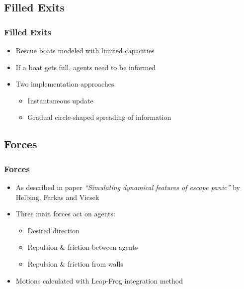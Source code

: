 \documentclass{beamer}
\begin{document}
\subsection{Filled Exits}
\begin{frame}
	\frametitle{Filled Exits}
	\begin{itemize}
		\item Rescue boats modeled with limited capacities
		\item If a boat gets full, agents need to be informed
		\item Two implementation approaches:
			\begin{itemize}
				\item Instantaneous update
				\item Gradual circle-shaped spreading of information
			\end{itemize}
	\end{itemize}
\end{frame}

\subsection{Forces}
\begin{frame}
	\frametitle{Forces}
	\begin{itemize}
		\item As described in paper \emph{``Simulating dynamical features
		      of escape panic''} by Helbing, Farkas and Vicsek
		\item Three main forces act on agents:
			\begin{itemize}
				\item Desired direction
				\item Repulsion \& friction between agents
				\item Repulsion \& friction from walls
			\end{itemize}
		\item Motions calculated with Leap-Frog integration method
	\end{itemize}
\end{frame}
\end{document}
